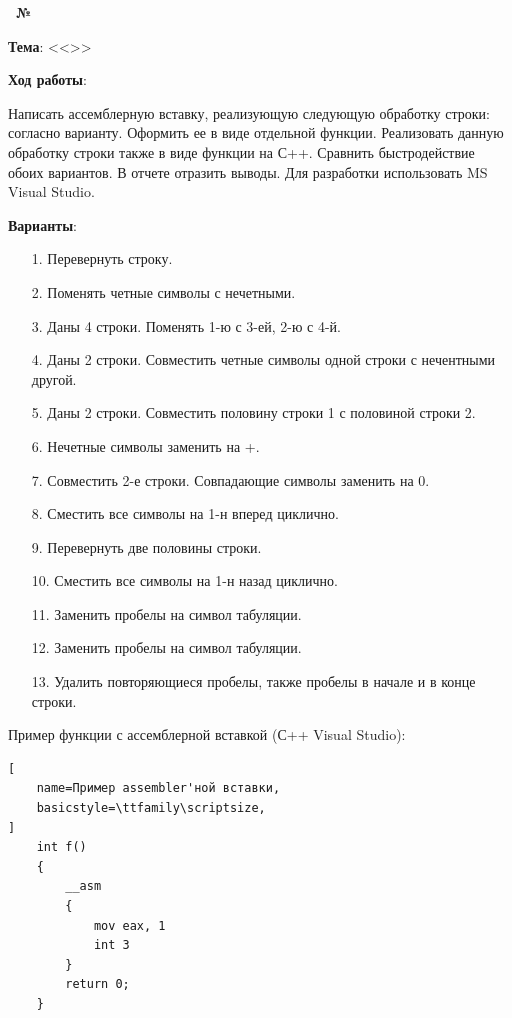 \begin{center}
    \textbf{\titlePageWorkType~№\titlePageWorkNumber~\titlePageWorkPart}
\end{center}

\textbf{Тема}: <<\titlePageTopic>>


\begin{center}
    \textbf{Ход работы}:
\end{center}

Написать ассемблерную вставку, реализующую следующую обработку строки: согласно варианту.
Оформить ее в виде отдельной функции.
Реализовать данную обработку строки также в виде функции на С++.
Сравнить быстродействие обоих вариантов.
В отчете отразить выводы.
Для разработки использовать MS Visual Studio.

\textbf{Варианты}:
\begin{enumerate}
    \item[1.] Перевернуть строку.
    \item[2.] Поменять четные символы с нечетными.
    \item[3.] Даны 4 строки. Поменять 1-ю с 3-ей, 2-ю с 4-й.
    \item[4.] Даны 2 строки. Совместить четные символы одной строки с нечентными другой.
    \item[5.] Даны 2 строки. Совместить половину строки 1 с половиной строки 2.
    \item[6.] Нечетные символы заменить на +.
    \item[7.] Совместить 2-е строки. Совпадающие символы заменить на 0.
    \item[8.] Сместить все символы на 1-н вперед циклично.
    \item[9.] Перевернуть две половины строки.
    \item[10.] Сместить все символы на 1-н назад циклично.
    \item[11.] Заменить пробелы на символ табуляции.
    \item[12.] Заменить пробелы на символ табуляции.
    \item[13.] Удалить повторяющиеся пробелы, также пробелы в начале и в конце строки.
\end{enumerate}

Пример функции с ассемблерной вставкой (С++ Visual Studio): 

\begin{lstlisting}[
    name=Пример assembler'ной вставки,
    basicstyle=\ttfamily\scriptsize,
]
    int f()
    {
        __asm
        {
            mov eax, 1
            int 3
        }
        return 0;
    }
\end{lstlisting}

